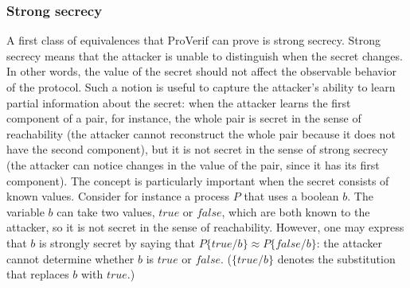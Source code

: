 \documentclass{book}
\begin{document}
\subsubsection{Strong secrecy}\label{sec:strongSecret}

A first class of equivalences that ProVerif can prove is strong secrecy.
Strong secrecy means that the attacker is unable to distinguish when the secret changes. %
In other words, the value of the secret should
not affect the observable behavior of the protocol. Such a notion is
useful to capture the attacker's ability to learn partial information
about the secret: when the attacker learns the first component of a pair, for instance, the whole pair is secret in the sense of reachability (the attacker cannot reconstruct the whole pair because it does not have the second component), but it is not secret in the sense of strong secrecy (the attacker can notice changes in the value of the pair, since it has its first component). The concept is particularly important when the secret consists of known values. Consider for instance a process $P$ that uses a boolean $b$. The variable $b$ can take two values, $\mathit{true}$ or $\mathit{false}$, which are both known to the attacker, so it is not secret in the sense of reachability. However, one may express that $b$ is strongly secret by saying that $P\{\mathit{true}/b\} \approx P\{\mathit{false}/b\}$: the attacker cannot determine whether $b$ is $\mathit{true}$ or $\mathit{false}$. ($\{\mathit{true}/b\}$ denotes the substitution that
replaces $b$ with $\mathit{true}$.)
\end{document}
